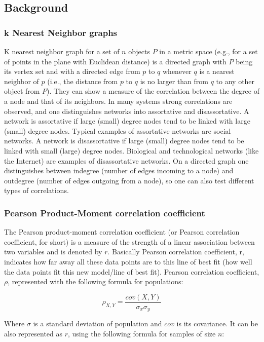 \subsection{Background}
\subsubsection{k Nearest Neighbor graphs}
K nearest neighbor graph for a set of $n$ objects $P$ in a metric space (e.g., for a set of points in the plane with Euclidean distance) is a directed graph with $P$ being its vertex set and with a directed edge from $p$ to $q$ whenever $q$ is a nearest neighbor of $p$ (i.e., the distance from $p$ to $q$ is no larger than from $q$ to any other object from $P$).
They can show a measure of the correlation between the degree of a node and that of its neighbors.
In many systems strong correlations are observed, and one distinguishes networks into assortative and disassortative.
A network is assortative if large (small) degree nodes tend to be linked with large (small) degree nodes.
Typical examples of assortative networks are social networks.
A network is disassortative if large (small) degree nodes tend to be linked with small (large) degree nodes.
Biological and technological networks (like the Internet) are examples of disassortative networks.
On a directed graph one distinguishes between indegree (number of edges incoming to a node) and outdegree (number of edges outgoing from a node), so one can also test different types of correlations.


\subsubsection{Pearson Product-Moment correlation coefficient}

The Pearson product-moment correlation coefficient (or Pearson correlation coefficient, for short) is a measure of the strength of a linear association between two variables and is denoted by $r$.
Basically Pearson correlation coefficient, r, indicates how far away all these data points are to this line of best fit (how well the data points fit this new model/line of best fit).
Pearson correlation coefficient, $\rho$, represented with the following formula for populations:

$$ \rho_{X,Y} = \frac{cov(X,Y)}{\sigma_x \sigma_y}$$

Where $\sigma$ is a standard deviation of population and $cov$ is its covariance.
It can be also represented as $r$, using the following formula for samples of size $n$:


